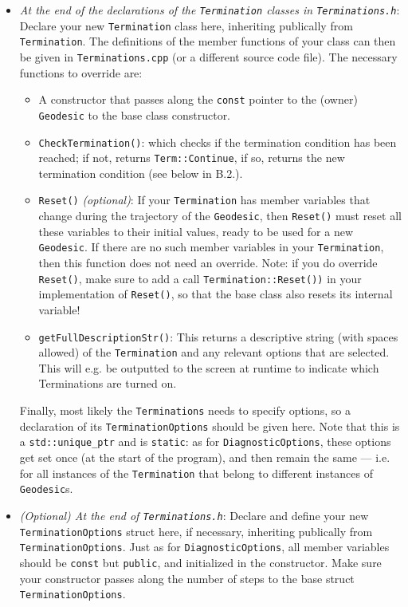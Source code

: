 \documentclass[11pt,a4paper]{article}
\newcommand{\code}[1]{{\tt #1}}
\begin{document}
\begin{itemize}
 \item[A.1.] \emph{At the end of the declarations of the \code{Termination} classes in \code{Terminations.h}}: Declare your new \code{Termination} class here, inheriting publically from \code{Termination}. The definitions of the member functions of your class can then be given in \code{Terminations.cpp} (or a different source code file). The necessary functions to override are:
 \begin{itemize}
 \item A constructor that passes along the \code{const} pointer to the (owner) \code{Geodesic} to the base class constructor.
 \item \code{CheckTermination()}: which checks if the termination condition has been reached; if not, returns \code{Term::Continue}, if so, returns the new termination condition (see below in B.2.).
  \item \code{Reset()} \emph{(optional)}: If your \code{Termination} has member variables that change during the trajectory of the \code{Geodesic}, then \code{Reset()} must reset all these variables to their initial values, ready to be used for a new \code{Geodesic}. If there are no such member variables in your \code{Termination}, then this function does not need an override. Note: if you do override \code{Reset()}, make sure to add a call \code{Termination::Reset())} in your implementation of \code{Reset()}, so that the base class also resets its internal variable!
 \item \code{getFullDescriptionStr()}: This returns a descriptive string (with spaces allowed) of the \code{Termination} and any relevant options that are selected. This will e.g. be outputted to the screen at runtime to indicate which Terminations are turned on.
 \end{itemize}
  Finally, most likely the \code{Terminations} needs to specify options, so a declaration of its \code{TerminationOptions} should be given here. Note that this is a \code{std::unique\_ptr} and is \code{static}: as for \code{DiagnosticOptions}, these options get set once (at the start of the program), and then remain the same --- i.e. for all instances of the \code{Termination} that belong to different instances of \code{Geodesic}s.
  
  \item[A.2.] \emph{(Optional) At the end of \code{Terminations.h}}: Declare and define your new \code{TerminationOptions} struct here, if necessary, inheriting publically from \code{TerminationOptions}. Just as for \code{DiagnosticOptions}, all member variables should be \code{const} but \code{public}, and initialized in the constructor. Make sure your constructor passes along the number of steps to the base struct \code{TerminationOptions}.
  

\end{itemize}
\end{document}
